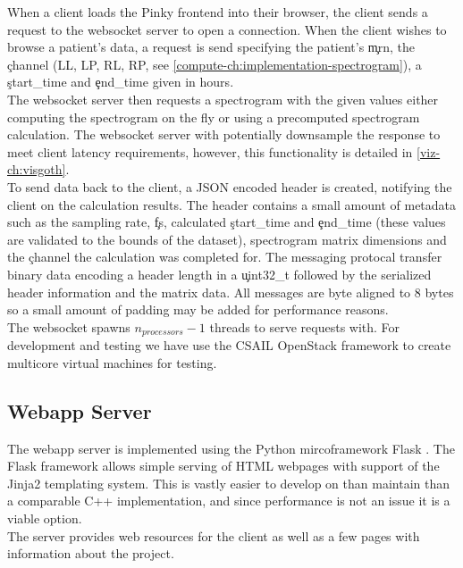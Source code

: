 When a client loads the Pinky frontend into their browser, the client sends a
request to the websocket server to open a connection. When the client wishes to
browse a patient's data, a request is send specifying the patient's \c{mrn},
the \c{channel} (LL, LP, RL, RP, see
\ref{compute-ch:implementation-spectrogram}), a \c{start\_time} and \c{end\_time}
given in hours. \\

The websocket server then requests a spectrogram with the given values either
computing the spectrogram on the fly or using a precomputed spectrogram
calculation. The websocket server with potentially downsample the response to
meet client latency requirements, however, this functionality is detailed in
\ref{viz-ch:visgoth}. \\

To send data back to the client, a JSON encoded header is created, notifying
the client on the calculation results. The header contains a small amount of
metadata such as the sampling rate, \c{fs}, calculated \c{start\_time} and
\c{end\_time} (these values are validated to the bounds of the dataset),
spectrogram matrix dimensions and the \c{channel} the calculation was completed
for. The messaging protocal transfer binary data encoding a header length in a
\c{uint32\_t} followed by the serialized header information and the matrix data.
All messages are byte aligned to 8 bytes so a small amount of padding may be
added for performance reasons. \\

The websocket spawns $n_{processors} - 1$ threads to serve requests with. For
development and testing we have use the CSAIL OpenStack framework to create
multicore virtual machines for testing.

\subsection{Webapp Server}\label{compute-ch:implementation-webapp}

The webapp server is implemented using the Python mircoframework Flask
\cite{flask}. The Flask framework allows simple serving of HTML webpages with
support of the Jinja2 \cite{jinja2} templating system. This is vastly easier to
develop on than maintain than a comparable C++ implementation, and since
performance is not an issue it is a viable option. \\

The server provides web resources for the client as well as a few pages with
information about the project.

